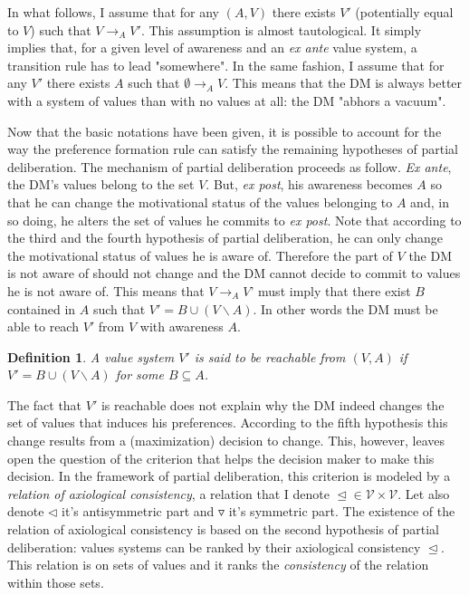 \documentclass[11pt]{article}
\newtheorem{definition}{Definition}
\begin{document}
 In what follows, I assume that for any $(A,V)$ there exists $V'$ (potentially equal to $V$) such that $V\rightarrow_{A}V'$. This assumption is almost tautological. It simply implies that, for a given level of awareness and an \textit{ex ante} value system, a transition rule has to lead "somewhere". In the same fashion, I assume that for any $V'$ there exists $A$ such that $\emptyset \rightarrow_A V$. This means that the DM is always better with a system of values than with no values at all: the DM "abhors a vacuum". 
 

Now that the basic notations have been given, it is possible to account for the way the preference formation rule can satisfy the remaining hypotheses of partial deliberation. The mechanism of partial deliberation proceeds as follow. \textit{Ex ante}, the DM's values belong to the set $V$. But, \textit{ex post}, his awareness becomes $A$ so that he can change the motivational status of the values belonging to $A$ and, in so doing, he alters the set of values he commits to \textit{ex post}. Note that according to the third and the fourth hypothesis of partial deliberation, he can only change the motivational status of values he is aware of. Therefore the part of $V$ the DM is not aware of should not change and the DM cannot decide to commit to values he is not aware of. This means that $V\rightarrow_{A} V$' must imply that there exist $ B$ contained in $A$ such that $V'=B\cup (V\backslash A)$. In other words the DM must be able to reach $V'$ from $V$ with awareness $A$. 

\begin{definition}
A value system $V'$ is said to be reachable from $(V,A)$ if $V'=B\cup (V\backslash A)$ for some $B\subseteq A$. 
\end{definition}

The fact that $V'$ is reachable does not explain why the DM indeed changes the set of values that induces his preferences. According to the fifth hypothesis this change results from a (maximization) decision to change. This, however, leaves open the question of the criterion that helps the decision maker to make this decision. In the framework of partial deliberation, this criterion is modeled by  a \textit{relation of axiological consistency}, a relation that I denote $\trianglelefteq\in \mathcal{V}\times \mathcal{V}$. Let also denote $\triangleleft$ it's antisymmetric part and $	\triangledown$ it's symmetric part. The existence of the relation of axiological consistency is based on the second hypothesis of partial deliberation: values systems can be ranked by their axiological consistency $\trianglelefteq$. This relation is on sets of values and it ranks the \textit{consistency} of the relation within those sets. 
\end{document}
